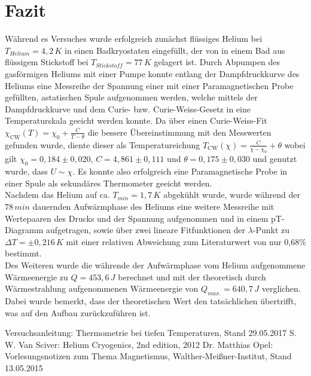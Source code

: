 \documentclass[twoside,colorback,accentcolor=tud4c,11pt]{tudreport}
\begin{document}
\chapter{Fazit}	
Während es Versuches wurde erfolgreich zunächst flüssiges Helium bei $T_{Helium}=4,2\,\si{K}$ in einen Badkryostaten eingefüllt, der von in einem Bad aus flüssigem Stickstoff bei $T_{Stickstoff}=77\,\si{K}$ gelagert ist. Durch Abpumpen des gasförmigen Heliums mit einer Pumpe konnte entlang der Dampfdruckkurve des Heliums eine Messreihe der Spannung einer mit einer Paramagnetischen Probe gefüllten, astatischen Spule aufgenommen werden, welche mittels der Dampfdruckkurve und dem Curie- bzw. Curie-Weiss-Gesetz in eine Temperaturskala geeicht werden konnte. Da über einen Curie-Weiss-Fit $\chi_{\text{CW}}(T)=\chi_0+\frac{C}{T-\theta}$ die bessere Übereinstimmung mit den Messwerten gefunden wurde, diente dieser als Temperatureichung $T_{\text{CW}}(\chi)=\frac{C}{\chi-\chi_0}+\theta$ wobei gilt $\chi_0=0,184\pm 0,020$, $C=4,861\pm 0,111$ und $\theta=0,175\pm 0,030$ und genutzt wurde, dass $U\sim\chi$. Es konnte also erfolgreich eine Paramagnetische Probe in einer Spule als sekundäres Thermometer geeicht werden.\\
Nachdem das Helium auf ca. $T_{min}=1,7\,\si{K}$ abgekühlt wurde, wurde während der $78\,\si{min}$ dauernden Aufwärmphase des Heliums eine weitere Messreihe mit Wertepaaren des Drucks und der Spannung aufgenommen und in einem pT-Diagramm aufgetragen, sowie über zwei lineare Fitfunktionen der $\lambda$-Punkt zu $\Delta T=\pm 0,216\,\si{K}$ mit einer relativen Abweichung zum Literaturwert von nur 0,68\% bestimmt.\\
Des Weiteren wurde die währende der Aufwärmphase vom Helium aufgenommene Wärmeenergie zu $Q=453,6\,\si{J}$ berechnet und mit der theoretisch durch Wärmestrahlung aufgenommenen Wärmeenergie von $Q_{max.}=640,7\,\si{J}$ verglichen. Dabei wurde bemerkt, dass der theoretischen Wert den tatsächlichen übertrifft, was auf den Aufbau zurückzuführen ist.
\renewcommand{\bibname}{Literatur}
\begin{thebibliography}{0}
 Versuchsanleitung: Thermometrie bei tiefen Temperaturen, Stand 29.05.2017
 S. W. Van Sciver: Helium Cryogenics, 2nd edition, 2012
 Dr. Matthias Opel: Vorlesungsnotizen zum Thema Magnetismus, Walther-Meißner-Institut, Stand 13.05.2015
\end{thebibliography}
\end{document}
